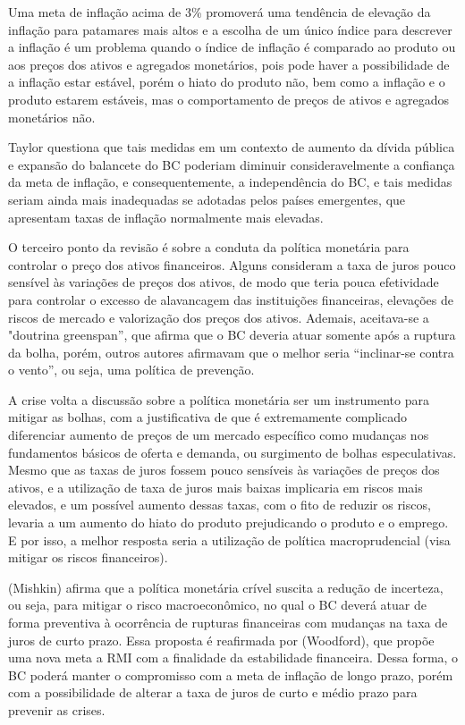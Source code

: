 \documentclass[report]{uftex}
\begin{document}
Uma meta de inflação acima de 3\% promoverá uma tendência de elevação da inflação para patamares mais altos e a escolha de um único índice para descrever a inflação é um problema quando o índice de inflação é comparado ao produto ou aos preços dos ativos e agregados monetários, pois pode haver a possibilidade de a inflação estar estável, porém o hiato do produto não, bem como a inflação e o produto estarem estáveis, mas o comportamento de preços de ativos e agregados monetários não. 

Taylor questiona que tais medidas em um contexto de aumento da dívida pública e expansão do balancete do BC poderiam diminuir consideravelmente a confiança da meta de inflação, e consequentemente, a independência do BC, e tais medidas seriam ainda mais inadequadas se adotadas pelos países emergentes, que apresentam taxas de inflação normalmente mais elevadas. 

O terceiro ponto da revisão é sobre a conduta da política monetária para controlar o preço dos ativos financeiros. Alguns consideram a taxa de juros pouco sensível às variações de preços dos ativos, de modo que teria pouca efetividade para controlar o excesso de alavancagem das instituições financeiras, elevações de riscos de mercado e valorização dos preços dos ativos. Ademais, aceitava-se a "doutrina greenspan”, que afirma que o BC deveria atuar somente após a ruptura da bolha, porém, outros autores afirmavam que o melhor seria ``inclinar-se contra o vento”, ou seja, uma política de prevenção. 

A crise volta a discussão sobre a política monetária ser um instrumento para mitigar as bolhas, com a justificativa de que é extremamente complicado diferenciar aumento de preços de um mercado específico como mudanças nos fundamentos básicos de oferta e demanda, ou surgimento de bolhas especulativas. Mesmo que as taxas de juros fossem pouco sensíveis às variações de preços dos ativos, e a utilização de taxa de juros mais baixas implicaria em riscos mais elevados, e um possível aumento dessas taxas, com o fito de reduzir os riscos, levaria a um aumento do hiato do produto prejudicando o produto e o emprego. E por isso, a melhor resposta seria a utilização de política macroprudencial (visa mitigar os riscos financeiros). 

(Mishkin) afirma que a política monetária crível suscita a redução de incerteza, ou seja, para mitigar o risco macroeconômico, no qual o BC deverá atuar de forma preventiva à ocorrência de rupturas financeiras com mudanças na taxa de juros de curto prazo. Essa proposta é reafirmada por (Woodford), que propõe uma nova meta a RMI com a finalidade da estabilidade financeira. Dessa forma, o BC poderá manter o compromisso com a meta de inflação de longo prazo, porém com a possibilidade de alterar a taxa de juros de curto e médio prazo para prevenir as crises.
\end{document}
